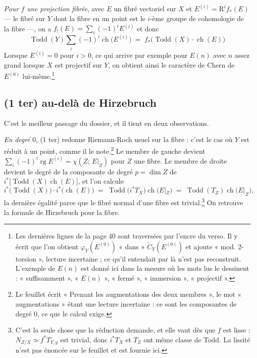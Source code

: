 \documentclass[11pt,a4paper]{article}
\begin{document}
\emph{Pour $f$ une projection fibrée}, avec $E$ un fibré vectoriel sur $X$
et $E^{(i)} = \mathrm{R}^{i}f_{*}(E)$ --- le fibré sur $Y$ dont la fibre en un
point est le $i$-ème groupe de cohomologie de la fibre ---, on a $f_{!}(E) =
\sum_{i}(-1)^{i}E^{(i)}$ et donc
\begin{equation*}
  \operatorname{Todd}(Y) \sum_{i}(-1)^{i}\operatorname{ch}\bigl(E^{(i)}\bigr)
  \;=\; f_{*}\bigl(\operatorname{Todd}(X)\cdot\operatorname{ch}(E)\bigr)
  \tag{1 ter}
\end{equation*}
Lorsque $E^{(i)} = 0$ pour $i > 0$, ce qui arrive par exemple pour $E(n)$
avec $n$ assez grand lorsque $X$ est projectif sur $Y$, on obtient ainsi le
caractère de Chern de $E^{(0)}$ lui-même.\footnote{Les dernières lignes de la
page 40 sont traversées par l'encre du verso. Il y écrit que l'on obtient
$\varphi_{Y}(E^{(0)})$ « dans » $\widetilde{C}_{Y}(E^{(0)})$ et ajoute « mod.
2-torsion », lecture incertaine ; ce qu'il entendait par là n'est pas
reconstruit. L'exemple de $E(n)$ est donné ici dans la mesure où les mots lus
le dessinent : « suffisamment », « $E(n)$ », « fermé », « immersion »,
« projectif ».}

\subsection*{(1 ter) au-delà de Hirzebruch}

C'est le meilleur passage du dossier, et il tient en deux observations.

\emph{En degré $0$}, (1 ter) redonne Riemann-Roch usuel sur la fibre : c'est le
cas où $Y$ est réduit à un point, comme il le note.\footnote{Le feuillet écrit
« Prenant les augmentations des deux membres », le mot « augmentations » étant
une lecture incertaine : ce sont les composantes de degré $0$, ce que le calcul
exige.} Le membre de gauche devient $\sum_{i}(-1)^{i}\operatorname{rg}
E^{(i)} = \chi(Z;\, E|_{Z})$ pour $Z$ une fibre. Le membre de droite devient le
degré de la composante de degré $p = \dim Z$ de $i^{*}\bigl[
\operatorname{Todd}(X)\operatorname{ch}(E)\bigr]$, et l'on calcule
\[
  i^{*}\bigl(\operatorname{Todd}(X)\bigr)\cdot i^{*}\bigl(\operatorname{ch}(E)\bigr)
  \;=\; \operatorname{Todd}\bigl(i^{*}T_{X}\bigr)\operatorname{ch}\bigl(E|_{Z}\bigr)
  \;=\; \operatorname{Todd}(T_{Z})\operatorname{ch}\bigl(E|_{Z}\bigr) ,
\]
la dernière égalité parce que le fibré normal d'une fibre est
trivial.\footnote{C'est la seule chose que la réduction demande, et elle vaut
dès que $f$ est lisse : $N_{Z/X} \simeq f^{*}T_{Y,y}$ est trivial, donc
$i^{*}T_{X}$ et $T_{Z}$ ont même classe de Todd. La lissité n'est pas énoncée
sur le feuillet et est fournie ici.} On retrouve la formule de Hirzebruch pour
la fibre.
\end{document}
